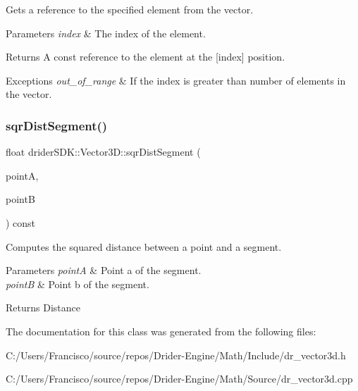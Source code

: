 Gets a reference to the specified element from the vector.


\begin{DoxyParams}{Parameters}
{\em index} & The index of the element.\\
\hline
\end{DoxyParams}
\begin{DoxyReturn}{Returns}
A const reference to the element at the \mbox{[}index\mbox{]} position.
\end{DoxyReturn}

\begin{DoxyExceptions}{Exceptions}
{\em out\+\_\+of\+\_\+range} & If the index is greater than number of elements in the vector. \\
\hline
\end{DoxyExceptions}
\mbox{\label{classdrider_s_d_k_1_1_vector3_d_a17428bbe32652edcba681b55e27853b2}} 
\subsubsection{\texorpdfstring{sqr\+Dist\+Segment()}{sqrDistSegment()}}
{\footnotesize\ttfamily float drider\+S\+D\+K\+::\+Vector3\+D\+::sqr\+Dist\+Segment (\begin{DoxyParamCaption}\item[{const \hyperlink{classdrider_s_d_k_1_1_vector3_d}{Vector3D} \&}]{pointA,  }\item[{const \hyperlink{classdrider_s_d_k_1_1_vector3_d}{Vector3D} \&}]{pointB }\end{DoxyParamCaption}) const}

Computes the squared distance between a point and a segment.


\begin{DoxyParams}{Parameters}
{\em pointA} & Point a of the segment.\\
\hline
{\em pointB} & Point b of the segment.\\
\hline
\end{DoxyParams}
\begin{DoxyReturn}{Returns}
Distance 
\end{DoxyReturn}


The documentation for this class was generated from the following files\+:\begin{DoxyCompactItemize}
\item 
C\+:/\+Users/\+Francisco/source/repos/\+Drider-\/\+Engine/\+Math/\+Include/dr\+\_\+vector3d.\+h\item 
C\+:/\+Users/\+Francisco/source/repos/\+Drider-\/\+Engine/\+Math/\+Source/dr\+\_\+vector3d.\+cpp\end{DoxyCompactItemize}
